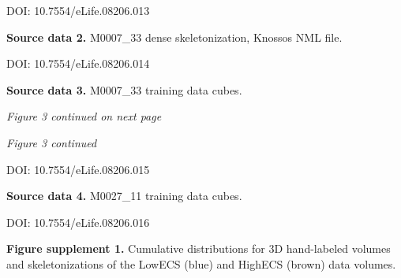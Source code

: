 \documentclass{article}
\begin{document}
\noindent DOI: 10.7554/eLife.08206.013

\noindent\textbf{Source data 2.} M0007\_33 dense skeletonization, Knossos NML file.

\noindent DOI: 10.7554/eLife.08206.014

\noindent\textbf{Source data 3.} M0007\_33 training data cubes.

\noindent \emph{Figure 3 continued on next page}

\noindent \emph{Figure 3 continued}

\noindent DOI: 10.7554/eLife.08206.015

\noindent\textbf{Source data 4.} M0027\_11 training data cubes.

\noindent DOI: 10.7554/eLife.08206.016

\noindent\textbf{Figure supplement 1.} Cumulative distributions for 3D hand-labeled volumes and skeletonizations of the LowECS (blue) and HighECS (brown) data volumes.
\end{document}
